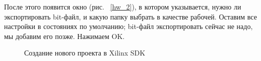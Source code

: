 \documentclass[a4paper,oneside ,10pt]{extreport}
\begin{document}
После этого появится окно (рис. ~\ref{hw_2}), в котором указывается, нужно ли 
экспортировать bit-файл, и какую папку выбрать в качестве рабочей. Оставим все 
настройки в состояниях по умолчанию; bit-файл экспортировать сейчас не надо, мы 
добавим его позже. Нажимаем OK.


\begin{figure}[htbp]	
	\caption{Создание нового проекта в Xilinx SDK} %
\end{figure}
\end{document}
